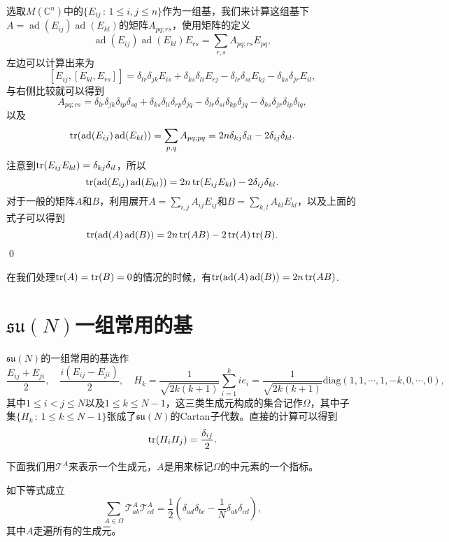 \documentclass[9pt]{extarticle}
\newcommand{\cc}{\mathbb{C}}
\DeclareMathOperator{\ad}{ad}
\begin{document}
\proof 选取$M(\cc^n)$中的$\{E_{ij}\,:\, 1\leq i,j\leq n\}$作为一组基，我们来计算这组基下$A=\ad(E_{ij})\ad(E_{kl})$的矩阵$A_{pq;rs}$，使用矩阵的定义
\[
\ad(E_{ij})\ad(E_{kl})E_{rs}=\sum_{r,s}A_{pq;rs}E_{pq},
\]
左边可以计算出来为
\[
[E_{ij},[E_{kl},E_{rs}]]=\delta_{lr}\delta_{jk}E_{is}+\delta_{ks}\delta_{li}E_{rj}-\delta_{lr}\delta_{si}E_{kj}-\delta_{ks}\delta_{jr}E_{il},
\]
与右侧比较就可以得到
\[
	A_{pq;rs}=\delta_{lr}\delta_{jk}\delta_{ip}\delta_{sq}+\delta_{ks}\delta_{li}\delta_{rp}\delta_{jq}-\delta_{lr}\delta_{si}\delta_{kp}\delta_{jq}-\delta_{ks}\delta_{jr}\delta_{ip}\delta_{lq},
\]
以及
\[
	\tr(\ad(E_{ij})\ad(E_{kl}))=\sum_{p,q}A_{pq;pq}=2n \delta_{kj}\delta_{il}-2\delta_{ij}\delta_{kl}.
\]
注意到$\operatorname{tr}(E_{ij}E_{kl})=\delta_{kj}\delta_{il}$，所以
\[
\tr(\ad(E_{ij})\ad(E_{kl}))=2n \tr(E_{ij}E_{kl}) -2\delta_{ij}\delta_{kl}.
\]
对于一般的矩阵$A$和$B$，利用展开$A=\sum_{i,j}A_{ij}E_{ij}$和$B=\sum_{k,l}A_{kl}E_{kl}$，以及上面的式子可以得到
\[
\tr(\ad(A)\ad(B))=2n \tr(AB) -2\tr(A)\tr(B).
\]\qed

在我们处理$\operatorname{tr}(A)=\operatorname{tr}(B)=0$的情况的时候，有$\tr(\ad(A)\ad(B))=2n \tr(AB)$. 

\clearpage
\section{$\mathfrak{su}(N)$一组常用的基}

$\mathfrak{su}(N)$的一组常用的基选作
\[
	\frac{E_{ij}+E_{ji}}{2},\quad \frac{i(E_{ij}-E_{ji})}{2},\quad H_k=\frac{1}{\sqrt{2k(k+1)}}\sum_{i=1}^{k} ie_{i}=\frac{1}{\sqrt{2k(k+1)}}
	\mathrm{diag}(1,1,\cdots,1,-k,0,\cdots,0),
\]
其中$1\leq i<j\leq N$以及$1\leq k \leq N-1$，这三类生成元构成的集合记作$\Omega$，其中子集$\{H_k\,:\,1\leq k \leq N-1\}$张成了$\mathfrak{su}(N)$的Cartan子代数。直接的计算可以得到
\[
	\operatorname{tr}(H_iH_j)=\frac{\delta_{ij}}{2}.
\]

下面我们用$\mathcal{T}^A$来表示一个生成元，$A$是用来标记$\Omega$的中元素的一个指标。

\pro 如下等式成立
\[
	\sum_{A\in \Omega}\mathcal{T}^A_{ab}\mathcal{T}^A_{cd}=\frac{1}{2}\left(\delta_{ad}\delta_{bc}-\frac{1}{N}\delta_{ab}\delta_{cd}\right),
\]
其中$A$走遍所有的生成元。
\end{document}
